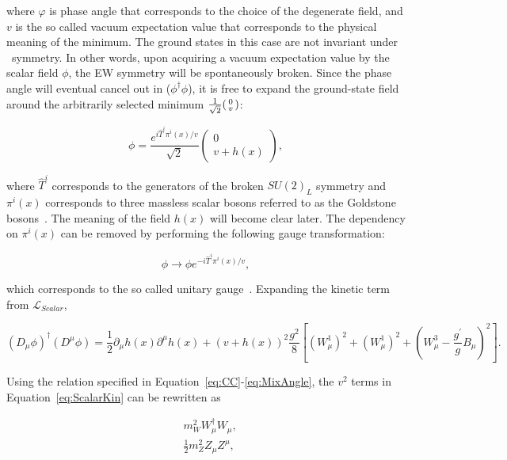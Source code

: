 where $\varphi$ is phase angle that corresponds to the choice of the degenerate field, and $v$ is the so called vacuum expectation value that corresponds to the physical meaning of the minimum. The ground states in this case are not invariant under \ew~symmetry. In other words, upon acquiring a vacuum expectation value by the scalar field $\phi$, the \ac{EW} symmetry will be spontaneously broken. Since the phase angle will eventual cancel out in ($\phi^{\dagger}\phi$), it is free to expand the ground-state field around the arbitrarily selected minimum $\frac{1}{\sqrt{2}}\begin{psmallmatrix}0\\v\end{psmallmatrix}$:

\begin{equation}
\phi=\frac{e^{i\hat{T}^{i}\pi^{i}(x)/v}}{\sqrt{2}}\begin{pmatrix}0\\v+h(x)\end{pmatrix},
\end{equation}

where $\hat{T}^{i}$ corresponds to the generators of the broken $SU(2)_{L}$ symmetry and $\pi^{i}(x)$ corresponds to three massless scalar bosons referred to as the Goldstone bosons~\cite{Goldstone:1962es}. The meaning of the field $h(x)$ will become clear later. The dependency on $\pi^{i}(x)$ can be removed by performing the following gauge transformation:

\begin{equation}
\phi\rightarrow\phi e^{-i\hat{T}^{i}\pi^{i}(x)/v},
\end{equation}

which corresponds to the so called unitary gauge~\cite{Weinberg:1971fb}. Expanding the kinetic term from $\mathcal{L}_{Scalar}$,

\begin{equation}
\label{eq:ScalarKin}
(D_{\mu}\phi)^{\dagger}(D^{\mu}\phi)=\frac{1}{2}\partial_{\mu}h(x)\partial^{\mu}h(x)+(v+h(x))^2\frac{g^2}{8}[(W_{\mu}^1)^2+(W_{\mu}^1)^2+(W_{\mu}^3-\frac{g^{\prime}}{g}B_{\mu})^2].
\end{equation}

Using the relation specified in Equation~\ref{eq:CC}-\ref{eq:MixAngle}, the $v^2$ terms in Equation~\ref{eq:ScalarKin} can be rewritten as 

\begin{equation}
\begin{split}
&m_{W}^2W^{\dagger}_{\mu}W_{\mu},\\
&\frac{1}{2}m_{Z}^2Z_{\mu}Z^{\mu},
\end{split}
\end{equation}

